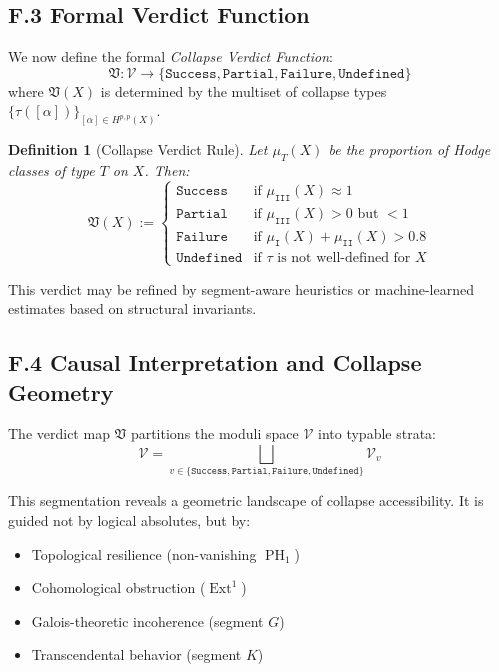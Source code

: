\documentclass[11pt]{article}
\newtheorem{definition}[theorem]{Definition}
\DeclareMathOperator{\Ext}{Ext}
\DeclareMathOperator{\PH}{PH}
\begin{document}
\subsection*{F.3 Formal Verdict Function}

We now define the formal \emph{Collapse Verdict Function}:
\[
\mathfrak{V} : \mathcal{V} \longrightarrow \{ \texttt{Success}, \texttt{Partial}, \texttt{Failure}, \texttt{Undefined} \}
\]
where $\mathfrak{V}(X)$ is determined by the multiset of collapse types $\{ \tau([\alpha]) \}_{[\alpha] \in H^{p,p}(X)}$.

\begin{definition}[Collapse Verdict Rule]
Let $\mu_T(X)$ be the proportion of Hodge classes of type $T$ on $X$. Then:
\[
\mathfrak{V}(X) :=
\begin{cases}
\texttt{Success} & \text{if } \mu_{\texttt{III}}(X) \approx 1 \\
\texttt{Partial} & \text{if } \mu_{\texttt{III}}(X) > 0 \text{ but } < 1 \\
\texttt{Failure} & \text{if } \mu_{\texttt{I}}(X) + \mu_{\texttt{II}}(X) > 0.8 \\
\texttt{Undefined} & \text{if } \tau \text{ is not well-defined for } X
\end{cases}
\]
\end{definition}

This verdict may be refined by segment-aware heuristics or machine-learned estimates based on structural invariants.

\subsection*{F.4 Causal Interpretation and Collapse Geometry}

The verdict map $\mathfrak{V}$ partitions the moduli space $\mathcal{V}$ into typable strata:
\[
\mathcal{V} = \bigsqcup_{v \in \{\texttt{Success}, \texttt{Partial}, \texttt{Failure}, \texttt{Undefined}\}} \mathcal{V}_v
\]

This segmentation reveals a geometric landscape of collapse accessibility. It is guided not by logical absolutes, but by:

\begin{itemize}
  \item Topological resilience (non-vanishing $\PH_1$)
  \item Cohomological obstruction ($\Ext^1$)
  \item Galois-theoretic incoherence (segment $G$)
  \item Transcendental behavior (segment $K$)
\end{itemize}
\end{document}
